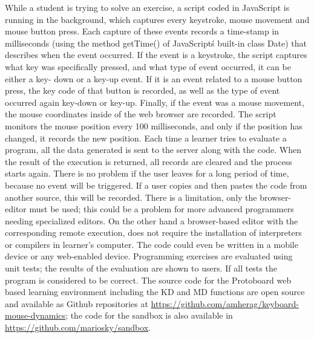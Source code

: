 \documentclass[a4paper,twoside]{article}
\begin{document}
While a student is trying
to solve an exercise, a script coded in JavaScript is running in the background,
which captures every keystroke, mouse movement and mouse button press. Each
capture of these events records a time-stamp in milliseconds (using the method
getTime() of JavaScript\'s built-in class Date) that describes when the event
occurred. If the event is a keystroke, the script captures what key was
specifically pressed, and what type of event occurred, it can be either a key-
down or a key-up event. If it is an event related to a mouse button press, the
key code of that button is recorded, as well as the type of event occurred again
key-down or key-up. Finally, if the event was a mouse movement, the mouse
coordinates inside of the web browser are recorded. The script monitors the
mouse position every 100 milliseconds, and only if the position has changed, it
records the new position. Each time a learner tries to evaluate a program, all
the data generated is sent to the server along with the code. When the result of
the execution is returned, all records are cleared and the process starts again.
There is no problem if the user leaves for a long period of time, because no
event will be triggered. If a user copies and then pastes the code from another
source, this will be recorded. There is a limitation, only the browser-editor
must be used; this could be a problem for more advanced programmers needing
specialized editors.  On the other hand a browser-based editor with the
corresponding remote execution, does not require the installation of
interpreters or compilers in learner’s computer. The code could even be written
in a mobile device or any web-enabled device. Programming exercises are evaluated using unit
tests; the results of the evaluation are shown to users. If all tests the
program is considered to be correct. The source code for the Protoboard web
based learning environment including the KD and MD functions are open source and
available as Github repositories at \url{https://github.com/amherag/keyboard-mouse-dynamics}; the code for the
sandbox is also available in \url{https://github.com/mariosky/sandbox}.

\end{document}
